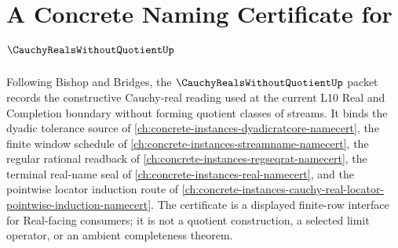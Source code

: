 \chapter{A Concrete Naming Certificate for $\CauchyRealsWithoutQuotientUp$}
\label{ch:concrete-instances-cauchy-reals-without-quotient-namecert}

Following Bishop and Bridges, the $\CauchyRealsWithoutQuotientUp$ packet records the constructive Cauchy-real reading used at the current L10 Real and Completion boundary without forming quotient classes of streams. It binds the dyadic tolerance source of \autoref{ch:concrete-instances-dyadicratcore-namecert}, the finite window schedule of \autoref{ch:concrete-instances-streamname-namecert}, the regular rational readback of \autoref{ch:concrete-instances-regseqrat-namecert}, the terminal real-name seal of \autoref{ch:concrete-instances-real-namecert}, and the pointwise locator induction route of \autoref{ch:concrete-instances-cauchy-real-locator-pointwise-induction-namecert}. The certificate is a displayed finite-row interface for Real-facing consumers; it is not a quotient construction, a selected limit operator, or an ambient completeness theorem.

